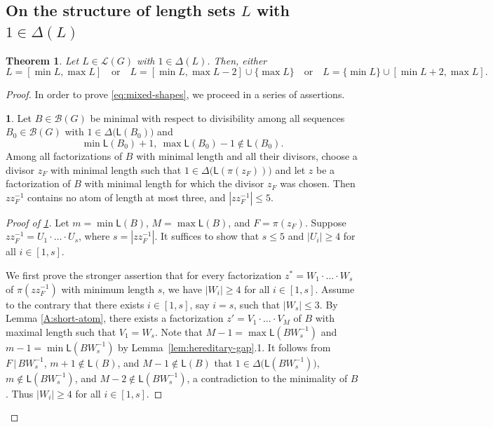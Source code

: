 \documentclass[a4paper, 10pt]{amsart}
\theoremstyle{plain}
\newtheorem{theorem}{\bf Theorem}[section]
\theoremstyle{definition}
\theoremstyle{definition}
\newtheorem{claim}{}[theorem]
\numberwithin{equation}{section}
\renewcommand{\t}{\, | \,}
\begin{document}
\subsection{On the structure  of length sets $L$ with $1 \in \Delta (L)$}


\begin{theorem} \label{thm:mixed-shape}
Let $L \in \mathcal L (G)$ with $1 \in \Delta ( L )$.
 Then, either
\begin{equation}
L  =[\min L, \max L] \quad\text{or} \quad
L =[\min L ,\max  L -2]\cup\{\max  L \}
 \quad\text{or}\quad
L =\{\min  L \}\cup[\min  L +2,\max  L].                     \label{eq:mixed-shapes}
\end{equation}
\end{theorem}

\begin{proof}
	
In order to prove
\eqref{eq:mixed-shapes}, we proceed in a series of assertions.  


\begin{claim}\label{A:protected-complement}
Let $B \in \mathcal B (G)$ be minimal with respect to divisibility among all
sequences $B_0 \in \mathcal B (G)$ with $1 \in \Delta \big(\mathsf L (B_0) \big)$ and
\[
 \min\mathsf L(B_0)+1,\ \max\mathsf L(B_0)-1\notin\mathsf L(B_0).
\]
Among all  factorizations of $B$ with minimal length and all their divisors, choose a
divisor $z_F$ with minimal length such that 
$1 \in \Delta \big(\mathsf L (\pi (z_F)) \big)$ and let $z$ be a factorization of $B$ with minimal length for which the divisor
$z_F$ was chosen.  Then $zz_F^{-1}$ contains no atom of length at most three, and $|zz_F^{-1}|\le 5$.
\end{claim}

\begin{proof}[Proof of \ref{A:protected-complement}]
Let $m = \min \mathsf L (B)$, $M = \max \mathsf L (B)$,  and $F = \pi  (z_F)$. Suppose $zz_F^{-1}=U_1\cdot \ldots \cdot U_s$, where $s=|zz_F^{-1}|$. It suffices to show that $s\le 5$ and $|U_i|\ge 4$ for all $i\in [1,s]$. 

We first prove the stronger assertion that for every factorization $z^*=W_1\cdot\ldots\cdot W_s$ of $\pi(zz_F^{-1})$ with minimum length $s$, we have $|W_i|\ge 4$ for all $i\in [1,s]$. 
Assume to the contrary that there exists $i\in [1,s]$, say $i=s$, such that $|W_s|\le 3$. By Lemma \ref{A:short-atom}, 
there exists a factorization $z'=V_1\cdot\ldots\cdot V_{M}$ of $B$  with maximal length such that $V_1=W_s$.  Note that $M-1=\max\mathsf L(BW_s^{-1})$ and $m-1=\min\mathsf L(BW_s^{-1})$ by Lemma~\ref{lem:hereditary-gap}.1. 
It follows from $F\t BW_s^{-1}$, $m+1\notin \mathsf L(B)$, and $M-1\not\in \mathsf L(B)$ that $1\in \Delta \big(\mathsf L(BW_s^{-1}) \big)$, $m\not\in \mathsf L(BW_s^{-1})$, and $M-2\notin \mathsf L(BW_s^{-1})$, a contradiction to the minimality of $B$. Thus  $|W_i|\ge 4$ for all $i\in [1,s]$. 


\end{proof}
\end{proof}
\end{document}

